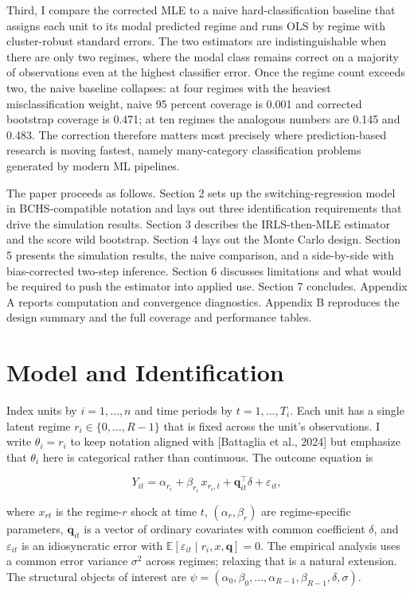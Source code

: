 \documentclass[
  12pt,
  letterpaper]{article}
\begin{document}
Third, I compare the corrected MLE to a naive hard-classification
baseline that assigns each unit to its modal predicted regime and runs
OLS by regime with cluster-robust standard errors. The two estimators
are indistinguishable when there are only two regimes, where the modal
class remains correct on a majority of observations even at the highest
classifier error. Once the regime count exceeds two, the naive baseline
collapses: at four regimes with the heaviest misclassification weight,
naive 95 percent coverage is 0.001 and corrected bootstrap coverage is
0.471; at ten regimes the analogous numbers are 0.145 and 0.483. The
correction therefore matters most precisely where prediction-based
research is moving fastest, namely many-category classification problems
generated by modern ML pipelines.

The paper proceeds as follows. Section 2 sets up the
switching-regression model in BCHS-compatible notation and lays out
three identification requirements that drive the simulation results.
Section 3 describes the IRLS-then-MLE estimator and the score wild
bootstrap. Section 4 lays out the Monte Carlo design. Section 5 presents
the simulation results, the naive comparison, and a side-by-side with
bias-corrected two-step inference. Section 6 discusses limitations and
what would be required to push the estimator into applied use. Section 7
concludes. Appendix A reports computation and convergence diagnostics.
Appendix B reproduces the design summary and the full coverage and
performance tables.

\FloatBarrier

\section{Model and Identification}\label{model-and-identification}

Index units by \(i = 1, \ldots, n\) and time periods by
\(t = 1, \ldots, T_i\). Each unit has a single latent regime
\(r_i \in \{0, \ldots, R-1\}\) that is fixed across the unit's
observations. I write \(\theta_i = r_i\) to keep notation aligned with
{[}Battaglia et al., 2024{]} but emphasize that \(\theta_i\) here is
categorical rather than continuous. The outcome equation is

\[
Y_{it} = \alpha_{r_i} + \beta_{r_i} \, x_{r_i, t} + \mathbf{q}_{it}^{\top} \delta + \varepsilon_{it},
\]

where \(x_{rt}\) is the regime-\(r\) shock at time \(t\),
\((\alpha_r, \beta_r)\) are regime-specific parameters,
\(\mathbf{q}_{it}\) is a vector of ordinary covariates with common
coefficient \(\delta\), and \(\varepsilon_{it}\) is an idiosyncratic
error with \(\mathbb{E}[\varepsilon_{it} \mid r_i, x, \mathbf{q}] = 0\).
The empirical analysis uses a common error variance \(\sigma^2\) across
regimes; relaxing that is a natural extension. The structural objects of
interest are
\(\psi = (\alpha_0, \beta_0, \ldots, \alpha_{R-1}, \beta_{R-1}, \delta, \sigma)\).
\end{document}
